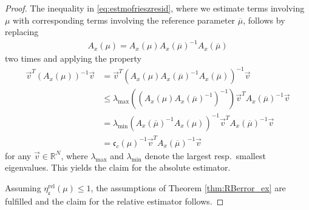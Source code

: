 \documentclass[10pt,a4paper]{amsart}
\newcommand{\RBestCcREL}{\eta_\mathfrak{c}^\text{rel}}
\newcommand{\RR}{\mathbb{R}}
\begin{document}
\begin{proof}
The inequality in \eqref{eq:estmofrieszresid}, where we estimate terms involving $\mu$ with corresponding terms involving the reference parameter $\overline{\mu}$, follows by replacing
\begin{align}
    A_x(\mu) = A_x(\mu)A_x(\overline{\mu})^{-1}A_x(\overline{\mu})
\end{align}
two times and applying the property
\begin{align}
    \Vec{v}^T \left(A_x(\mu)\right)^{-1} \Vec{v} &= \Vec{v}^T \left(A_x(\mu)A_x(\overline{\mu})^{-1}A_x(\overline{\mu})\right)^{-1} \Vec{v} \\&\leq \lambda_{\max}\left(\left(A_x(\mu)A_x(\overline{\mu})^{-1}\right)^{-1}\right) \Vec{v}^T A_x(\overline{\mu})^{-1} \Vec{v} \\
    &= \lambda_{\min}\left(A_x(\overline{\mu})^{-1} A_x(\mu)\right)^{-1} \Vec{v}^T A_x(\overline{\mu})^{-1} \Vec{v} \\
    &= \mathfrak{c}_c(\mu)^{-1} \Vec{v}^T A_x(\overline{\mu})^{-1} \Vec{v}
\end{align}
for any $\Vec{v} \in \RR^N$, where $\lambda_{\max}$ and $\lambda_{\min}$ denote the largest resp.~smallest eigenvalues. This yields the claim for the absolute estimator. 

Assuming $\RBestCcREL(\mu) \leq 1$, the assumptions of Theorem \ref{thm:RBerror_ex} are fulfilled and the claim for the relative estimator follows.
\end{proof}
\end{document}
